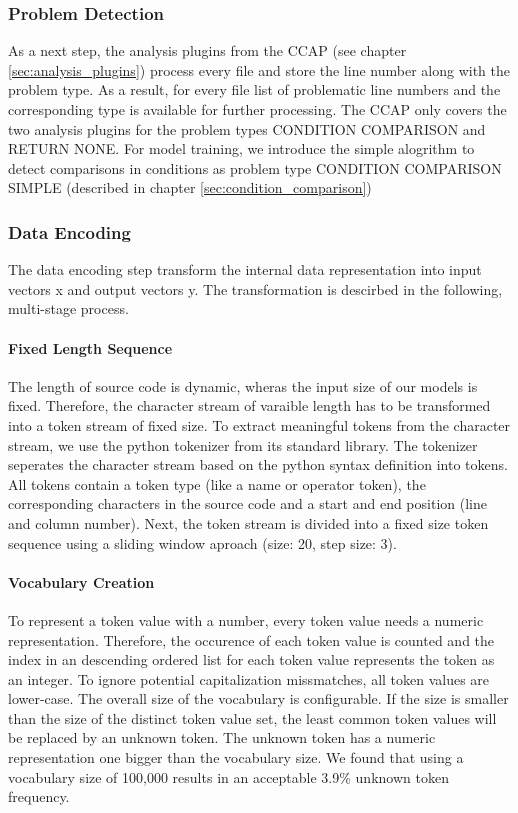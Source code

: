 \subsubsection{Problem Detection}\label{sec:problem_detection}
As a next step, the analysis plugins from the CCAP (see chapter \ref{sec:analysis_plugins}) process every file and store the line number along with the problem type. As a result, for every file list of problematic line numbers and the corresponding type is available for further processing. The CCAP only covers the two analysis plugins for the problem types CONDITION COMPARISON and RETURN NONE. For model training, we introduce the simple alogrithm to detect comparisons in conditions as problem type CONDITION COMPARISON SIMPLE (described in chapter \ref{sec:condition_comparison})



\subsubsection{Data Encoding}\label{sec:data_encoding}
The data encoding step transform the internal data representation into input vectors x and output vectors y. The transformation is descirbed in the following, multi-stage process.

\paragraph{Fixed Length Sequence}
The length of source code is dynamic, wheras the input size of our models is fixed. Therefore, the character stream of varaible length has to be transformed into a token stream of fixed size. 
To extract meaningful tokens from the character stream, we use the python tokenizer from its standard library. The tokenizer seperates the character stream based on the python syntax definition into tokens. All tokens contain a token type (like a name or operator token), the corresponding characters in the source code and a start and end position (line and column number). Next, the token stream is divided into a fixed size token sequence using a sliding window aproach (size: 20, step size: 3).
\paragraph{Vocabulary Creation}
To represent a token value with a number, every token value needs a numeric representation. Therefore, the occurence of each token value is counted and the index in an descending ordered list for each token value represents the token as an integer. To ignore potential capitalization missmatches, all token values are lower-case. The overall size of the vocabulary is configurable. If the size is smaller than the size of the distinct token value set, the least common token values will be replaced by an unknown token. The unknown token has a numeric representation one bigger than the vocabulary size. We found that using a vocabulary size of 100,000 results in an acceptable 3.9\% unknown token frequency.
